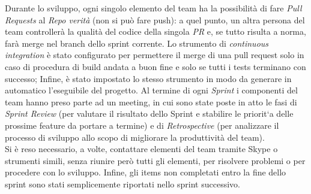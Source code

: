 \newline
Durante lo sviluppo, ogni singolo elemento del team ha la possibilità di fare \textit{Pull Requests} al 
\textit{Repo verità} (non si può fare push): a quel punto,
un altra persona del team controllerà la qualità del codice della singola \textit{PR} e, 
se tutto risulta a norma, farà merge nel branch dello sprint corrente.
Lo strumento di \textit{continuous integration} è stato configurato per permettere il merge di una pull request solo in caso di procedura di build andata a buon fine e solo se tutti i tests terminano con successo; Infine, è stato impostato lo stesso strumento in modo da
generare in automatico l'eseguibile del progetto.
\newline
Al termine di ogni \textit{Sprint} i componenti del team hanno preso parte ad un meeting, in cui sono state
poste in atto le fasi di \textit{Sprint Review} (per valutare il risultato dello Sprint e stabilire le priorit`a delle
prossime feature da portare a termine) e di \textit{Retrospective} (per analizzare il processo di sviluppo
allo scopo di migliorare la produttività del team).
\\
Si è reso necessario, a volte, contattare elementi del team tramite Skype o strumenti simili, 
senza riunire però tutti gli elementi, per risolvere problemi o per procedere con lo sviluppo.
Infine, gli items non completati entro la fine dello sprint sono stati semplicemente riportati
nello sprint successivo.

